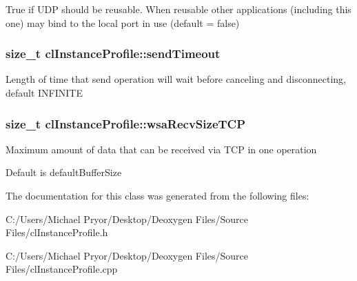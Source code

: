 \label{classcl_instance_profile_a9f2be3ef8894a136d5af5df66150765f}
True if UDP should be reusable. When reusable other applications (including this one) may bind to the local port in use (default = false) \hypertarget{classcl_instance_profile_a3542eb64b33a9a54a15dcf9a141cd870}{
\subsubsection[{sendTimeout}]{\setlength{\rightskip}{0pt plus 5cm}size\_\-t {\bf clInstanceProfile::sendTimeout}}}
\label{classcl_instance_profile_a3542eb64b33a9a54a15dcf9a141cd870}
Length of time that send operation will wait before canceling and disconnecting, default INFINITE \hypertarget{classcl_instance_profile_ae3682372f32240378daadac7a3a5ab50}{
\subsubsection[{wsaRecvSizeTCP}]{\setlength{\rightskip}{0pt plus 5cm}size\_\-t {\bf clInstanceProfile::wsaRecvSizeTCP}}}
\label{classcl_instance_profile_ae3682372f32240378daadac7a3a5ab50}
Maximum amount of data that can be received via TCP in one operation \par
 Default is defaultBufferSize 

The documentation for this class was generated from the following files:\begin{DoxyCompactItemize}
\item 
C:/Users/Michael Pryor/Desktop/Deoxygen Files/Source Files/clInstanceProfile.h\item 
C:/Users/Michael Pryor/Desktop/Deoxygen Files/Source Files/clInstanceProfile.cpp\end{DoxyCompactItemize}
